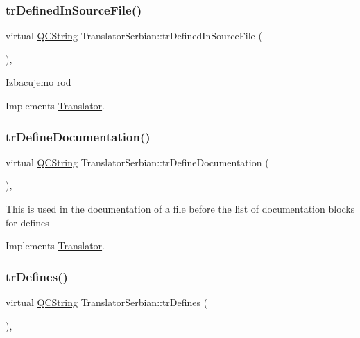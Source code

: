 \subsubsection{\texorpdfstring{trDefinedInSourceFile()}{trDefinedInSourceFile()}}
{\footnotesize\ttfamily virtual \mbox{\hyperlink{class_q_c_string}{Q\+C\+String}} Translator\+Serbian\+::tr\+Defined\+In\+Source\+File (\begin{DoxyParamCaption}{ }\end{DoxyParamCaption})\hspace{0.3cm}{\ttfamily [inline]}, {\ttfamily [virtual]}}

Izbacujemo rod

Implements \mbox{\hyperlink{class_translator}{Translator}}.

\mbox{\label{class_translator_serbian_a515e7bec0c6c96323c9abd1ded9dc95a}} 
\subsubsection{\texorpdfstring{trDefineDocumentation()}{trDefineDocumentation()}}
{\footnotesize\ttfamily virtual \mbox{\hyperlink{class_q_c_string}{Q\+C\+String}} Translator\+Serbian\+::tr\+Define\+Documentation (\begin{DoxyParamCaption}{ }\end{DoxyParamCaption})\hspace{0.3cm}{\ttfamily [inline]}, {\ttfamily [virtual]}}

This is used in the documentation of a file before the list of documentation blocks for defines 

Implements \mbox{\hyperlink{class_translator}{Translator}}.

\mbox{\label{class_translator_serbian_a0224a435655cfdcd99f28859036d2f6b}} 
\subsubsection{\texorpdfstring{trDefines()}{trDefines()}}
{\footnotesize\ttfamily virtual \mbox{\hyperlink{class_q_c_string}{Q\+C\+String}} Translator\+Serbian\+::tr\+Defines (\begin{DoxyParamCaption}{ }\end{DoxyParamCaption})\hspace{0.3cm}{\ttfamily [inline]}, {\ttfamily [virtual]}}

